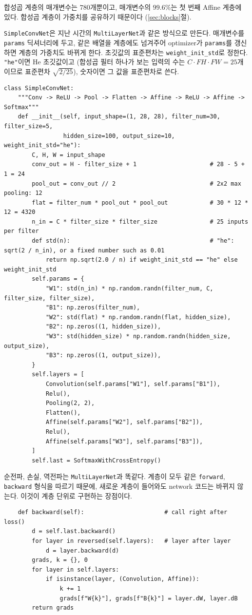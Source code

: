 \documentclass[11pt,a4paper]{article}
\begin{document}
합성곱 계층의 매개변수는 $780$개뿐이고, 매개변수의 $99.6\%$는 첫 번째 Affine 계층에 있다.
합성곱 계층이 가중치를 공유하기 때문이다 (\ref{sec:blocks}절).

\texttt{SimpleConvNet}은 지난 시간의 \texttt{MultiLayerNet}과 같은 방식으로 만든다.
매개변수를 \texttt{params} 딕셔너리에 두고, 같은 배열을 계층에도 넘겨주어
optimizer가 \texttt{params}를 갱신하면 계층의 가중치도 바뀌게 한다.
초깃값의 표준편차는 \texttt{weight\_init\_std}로 정한다. \texttt{"he"}이면 He 초깃값이고
(합성곱 필터 하나가 보는 입력의 수는 $C\cdot FH\cdot FW=25$개이므로 표준편차 $\sqrt{2/25}$), 숫자이면 그 값을 표준편차로 쓴다.
\begin{lstlisting}
class SimpleConvNet:
    """Conv -> ReLU -> Pool -> Flatten -> Affine -> ReLU -> Affine -> Softmax"""
    def __init__(self, input_shape=(1, 28, 28), filter_num=30, filter_size=5,
                 hidden_size=100, output_size=10, weight_init_std="he"):
        C, H, W = input_shape
        conv_out = H - filter_size + 1                     # 28 - 5 + 1 = 24
        pool_out = conv_out // 2                           # 2x2 max pooling: 12
        flat = filter_num * pool_out * pool_out            # 30 * 12 * 12 = 4320
        n_in = C * filter_size * filter_size               # 25 inputs per filter
        def std(n):                                        # "he": sqrt(2 / n_in), or a fixed number such as 0.01
            return np.sqrt(2.0 / n) if weight_init_std == "he" else weight_init_std
        self.params = {
            "W1": std(n_in) * np.random.randn(filter_num, C, filter_size, filter_size),
            "B1": np.zeros(filter_num),
            "W2": std(flat) * np.random.randn(flat, hidden_size),
            "B2": np.zeros((1, hidden_size)),
            "W3": std(hidden_size) * np.random.randn(hidden_size, output_size),
            "B3": np.zeros((1, output_size)),
        }
        self.layers = [
            Convolution(self.params["W1"], self.params["B1"]),
            Relu(),
            Pooling(2, 2),
            Flatten(),
            Affine(self.params["W2"], self.params["B2"]),
            Relu(),
            Affine(self.params["W3"], self.params["B3"]),
        ]
        self.last = SoftmaxWithCrossEntropy()
\end{lstlisting}
순전파, 손실, 역전파는 \texttt{MultiLayerNet}과 똑같다.
계층이 모두 같은 \texttt{forward}, \texttt{backward} 형식을 따르기 때문에,
새로운 계층이 들어와도 network 코드는 바뀌지 않는다. 이것이 계층 단위로 구현하는 장점이다.
\begin{lstlisting}
    def backward(self):                       # call right after loss()
        d = self.last.backward()
        for layer in reversed(self.layers):   # layer after layer
            d = layer.backward(d)
        grads, k = {}, 0
        for layer in self.layers:
            if isinstance(layer, (Convolution, Affine)):
                k += 1
                grads[f"W{k}"], grads[f"B{k}"] = layer.dW, layer.dB
        return grads
\end{lstlisting}
\end{document}
